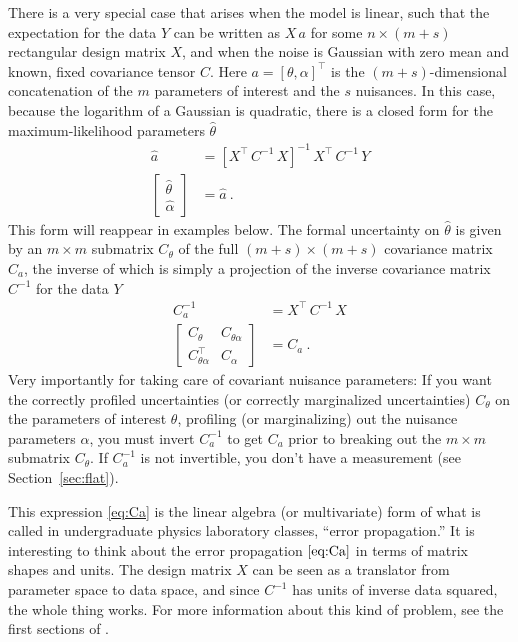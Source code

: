 \documentclass{article}
\newcommand{\sectionname}{Section}
\newcommand{\secref}[1]{\sectionname~\ref{#1}}
\begin{document}
There is a very special case that arises when the model is linear,
such that the expectation for the data $Y$ can be written as $X\,a$ for some $n\times (m+s)$ rectangular design matrix $X$,
and when the noise is Gaussian with zero mean and known, fixed covariance tensor $C$.
Here $a = [\theta,\alpha]^\top$ is the $(m+s)$-dimensional concatenation of the $m$ parameters of interest and the $s$ nuisances.
In this case, because the logarithm of a Gaussian is quadratic, there is a closed form for the maximum-likelihood parameters $\hat\theta$
\begin{align}
    \hat a &= [X^\top\,C^{-1}\,X]^{-1}\,X^\top\,C^{-1}\,Y \label{eq:wls} \\
    \begin{bmatrix}\hat\theta \\ \hat\alpha\end{bmatrix} &= \hat a ~.
\end{align}
This form will reappear in examples below.
The formal uncertainty on $\hat\theta$ is given by an $m\times m$ submatrix $C_\theta$ of the full $(m+s)\times (m+s)$ covariance matrix $C_a$, the inverse of which is simply a projection of the inverse covariance matrix $C^{-1}$ for the data $Y$
\begin{align}
    C_a^{-1} &= X^\top\,C^{-1}\,X \label{eq:Ca} \\
    \begin{bmatrix}C_\theta & C_{\theta\alpha} \\ C_{\theta\alpha}^\top & C_\alpha\end{bmatrix} &= C_a ~.
\end{align}
Very importantly for taking care of covariant nuisance parameters:
If you want the correctly profiled uncertainties (or correctly marginalized uncertainties) $C_\theta$ on the parameters of interest $\theta$, profiling (or marginalizing) out the nuisance parameters $\alpha$, you must invert $C_a^{-1}$ to get $C_a$ prior to breaking out the $m\times m$ submatrix $C_\theta$.
If $C_a^{-1}$ is not invertible, you don't have a measurement (see \secref{sec:flat}).

This expression \eqref{eq:Ca} is the linear algebra (or multivariate) form of what is called in undergraduate physics laboratory classes, ``error propagation.''
It is interesting to think about the error propagation $\eqref{eq:Ca}$ in terms of matrix shapes and units.
The design matrix $X$ can be seen as a translator from parameter space to data space, and since $C^{-1}$ has units of inverse data squared, the whole thing works.
For more information about this kind of problem, see the first sections of \cite{fittingaline}.
\end{document}
